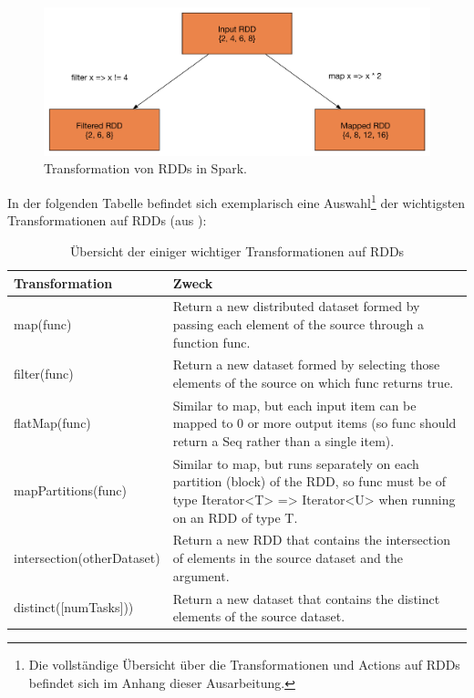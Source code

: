 \begin{figure}[htb!]
\centering
\includegraphics[width=1.0\textwidth]{bilder/transform.png}
\caption{Transformation von RDDs in Spark.}
\label{fig:sparktransform}
\end{figure} 


 \newpage
In der folgenden Tabelle befindet sich exemplarisch eine Auswahl\footnote{Die vollständige Übersicht über die Transformationen und Actions auf RDDs befindet sich im Anhang dieser Ausarbeitung.} der wichtigsten Transformationen auf RDDs (aus ): 


\begin{table}[!ht]
\centering
\begin{tabular}{| p{5cm} | p{8cm} | }
\hline
Transformation & Zweck \\ \hline \hline
map(func) & Return a new distributed dataset formed by passing each element of the source through a function func.  \\ \hline 
filter(func) & Return a new dataset formed by selecting those elements of the source on which func returns true. \\ \hline 
flatMap(func) & Similar to map, but each input item can be mapped to 0 or more output items (so func should return a Seq rather than a single item).\\ \hline 
mapPartitions(func) & Similar to map, but runs separately on each partition (block) of the RDD, so func must be of type Iterator<T> => Iterator<U> when running on an RDD of type T. \\ \hline 
intersection(otherDataset) & Return a new RDD that contains the intersection of elements in the source dataset and the argument. \\ \hline 
distinct([numTasks])) & Return a new dataset that contains the distinct elements of the source dataset. \\ \hline 

\end{tabular}
\caption{Übersicht der einiger wichtiger Transformationen auf RDDs}
	\label{tab:transformations}
\end{table}


